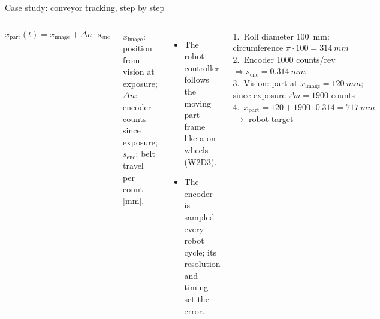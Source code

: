\documentclass[aspectratio=169,10pt]{beamer}
\begin{document}
\begin{frame}{Case study: conveyor tracking, step by step}
\begin{columns}[T]
\begin{eqbox}
\vspace{-2mm}
\[ x_\text{part}(t)=x_\text{image}+\Delta n\cdot s_\text{enc} \]
\vspace{-4mm}
\end{eqbox}
{\small $x_\text{image}$: position from vision at exposure; $\Delta n$: encoder counts since exposure; $s_\text{enc}$: belt travel per count [mm].}

\vspace{2mm}
\begin{itemize}\small
\item The robot controller follows the moving part frame like a  on wheels (W2D3).
\item The encoder is sampled every robot cycle; its resolution and timing set the error.
\end{itemize}
\begin{keybox}
\small
1.\ Roll diameter \SI{100}{mm}: circumference $\pi\cdot100=\SI{314}{mm}$\\[1mm]
2.\ Encoder 1000 counts/rev $\Rightarrow s_\text{enc}=\SI{0.314}{mm}$\\[1mm]
3.\ Vision: part at $x_\text{image}=\SI{120}{mm}$; since exposure $\Delta n=1900$ counts\\[1mm]
4.\ $x_\text{part}=120+1900\cdot0.314=\SI{717}{mm}$ $\rightarrow$ robot target
\end{keybox}
\end{columns}
\end{frame}
\end{document}

